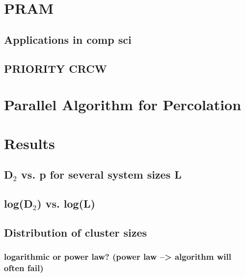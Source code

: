 \documentclass{umthesis}
\begin{document}
\section{PRAM}
\label{sec-4.3}
\subsection{Applications in comp sci}
\label{sec-4.3.1}
\subsection{PRIORITY CRCW}
\label{sec-4.3.2}
\section{Parallel Algorithm for Percolation}
\label{sec-4.4}
\section{Results}
\label{sec-4.5}
\subsection{D$_2$ vs. p for several system sizes L}
\label{sec-4.5.1}
\subsection{log(D$_2$) vs. log(L)}
\label{sec-4.5.2}
\subsection{Distribution of cluster sizes}
\label{sec-4.5.3}
\subsubsection{logarithmic or power law? (power law --> algorithm will often fail)}
\label{sec-4.5.3.1}






 
\end{document}
